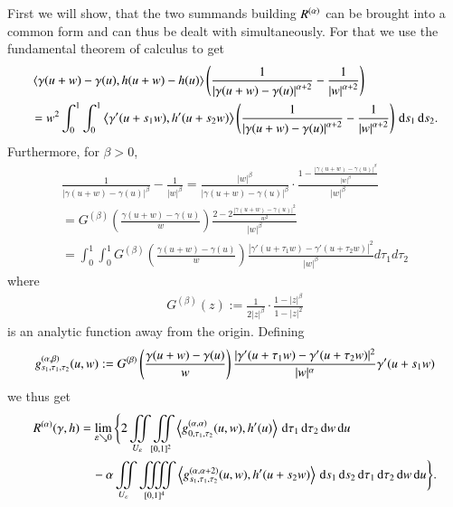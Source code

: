 First we will show, that the two summands building $R^{(\alpha)}$ can be brought into a common form 
and can thus be dealt with simultaneously. For that we use the fundamental theorem of calculus
to get
\begin{align*}
 &\left\langle{\gamma}(u+w)-{\gamma}(u),{h}(u+w)-{h}(u)\right\rangle \left(\frac1{\left|{\gamma}(u+w)-{\gamma}(u)\right|^{\alpha+2}} - \frac1{\left|w\right|^{\alpha+2}}\right) \\
 &= w^2\int_0^1 \int_0^1 \left\langle{\gamma}' (u+s_1 w),{h}'(u+s_2 w)\right\rangle \left(\frac1{\left|{\gamma}(u+w)-{\gamma}(u)\right|^{\alpha+2}} - \frac1{\left|w\right|^{\alpha+2}}\right)
  \,\mathrm{d} s_1 \,\mathrm{d} s_2.
\end{align*}
Furthermore, for $\beta>0$,
\begin{multline*}
 \frac 1 {|\gamma(u+w) - \gamma(u)|^\beta} - \frac 1 {|w|^\beta} 
  = \frac {|w|^\beta}{|\gamma(u+w)-\gamma(u)|^\beta} \cdot
     \frac {1- \frac {|\gamma(u+w)-\gamma(u)|^\beta}{|w|^\beta}} {|w|^\beta} \\
  = G^{(\beta)}\left(\frac {\gamma(u+w)-\gamma(u)}{w}\right)
     \frac {2-2\frac {|\gamma(u+w)-\gamma(u)|^2}{w^2}} {|w|^\beta} \\
  = \int_{0}^1 \int_{0}^1 G^{(\beta)}\left(\frac {\gamma(u+w)-\gamma(u)}{w}\right)
  \frac {|\gamma'(u+\tau_1 w) - \gamma'(u+\tau_2 w)|^2}{|w|^\beta} d\tau_1 d \tau_2
\end{multline*}
where
\begin{align*}
 G^{(\beta)}(z) := \frac 1 {2|z|^\beta} \cdot \frac {1- |z|^\beta}{1 - |z|^2}
\end{align*}
is an analytic function away from the origin. Defining
\[ g^{(\alpha,\beta)}_{s_1, \tau_1, \tau_2}(u,w) :=  G^{(\beta)} 
\left(\frac {\gamma(u+w) - \gamma(u)}{w} \right) \frac {|\gamma'(u+\tau_1 w) -\gamma'(u+\tau_2 w)|^2}{|w|^\alpha} 
\gamma'(u+s_1 w) \]%
we thus get
%  
% 
\begin{equation}\label{eq:DecompositionOfR}
\begin{aligned}
 R^{(\alpha)}(\gamma,h)
 &= \lim_{\varepsilon \searrow 0} \Bigg\{2\iint\limits_{U_{\varepsilon}}\iint\limits_{[0,1]^2} \left\langle g^{(\alpha,\alpha)}_{0,\tau_1,\tau_2}(u,w), 
  h'(u) \right\rangle \,\mathrm{d}\tau_1 \,\mathrm{d}\tau_2\,\mathrm{d} w\,\mathrm{d} u \\
 & \quad - \alpha \iint\limits_{U_{\varepsilon}}\iiiint\limits_{[0,1]^4} \left\langle g^{(\alpha,\alpha+2)}_{s_1,\tau_1,\tau_2}(u,w), 
  h'(u+s_2 w) \right\rangle \,\mathrm{d} s_1 \,\mathrm{d} s_2 \,\mathrm{d}\tau_1 \,\mathrm{d}\tau_2\,\mathrm{d} w\,\mathrm{d} u \Bigg\}.
 \end{aligned}
\end{equation}

